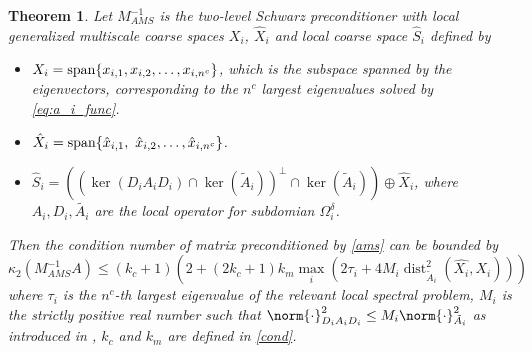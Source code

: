 \documentclass{article}
\DeclareMathOperator{\Dist}{dist}
\DeclareMathOperator{\Span}{span}
\DeclarePairedDelimiter{\CurlyBrackets}{\{}{\}}
\newtheorem{theorem}{Theorem}[section]
\theoremstyle{definition}
\theoremstyle{remark}
\begin{document}
\begin{theorem}
    Let $M_{AMS}^{-1}$ is the two-level Schwarz preconditioner with local generalized multiscale coarse spaces $X_i$, $\hat{X}_i$ and local coarse space $\hat{S}_i$ defined by
    \begin{itemize}
        \item $X_{i} = \Span \CurlyBrackets*{x_{i, 1}, x_{i, 2}, \dots, x_{i,n^c}}$, which is the subspace spanned by the eigenvectors, corresponding to the $n^c$ largest eigenvalues solved by \cref{eq:a_i_func}.
        \item $\hat{X}_{i} = \Span \CurlyBrackets*{\hat{x}_{i, 1},\ \hat{x}_{i, 2}, \dots, \hat{x}_{i,n^c}}$.
        \item $\hat{S}_{i} = ((\ker(D_i A_{i} D_i) \cap \ker(\tilde{A}_{i}))^{\perp} \cap \ker(\tilde{A}_{i}))\oplus \hat{X}_i$, where $A_i,D_i,\tilde{A_i}$ are the local operator for subdomian $\Omega_i^\delta$.
    \end{itemize}
    Then the condition number of matrix preconditioned by \cref{ams} can be bounded by
\begin{equation}\label{bound}
    \kappa_2(M_{AMS}^{-1} A) \leq (k_c + 1)\left(2 + (2k_c + 1) k_m \max_i (2\tau_i + 4 M_i\Dist^2_{\tilde{A}_i}(\hat{X_i}, X_i))\right)
\end{equation}
where $\tau_i$ is the $n^c$-th largest eigenvalue of the relevant local spectral problem, $M_i$ is the strictly positive real number such that $\norm{\cdot}^{2}_{D_iA_iD_i}\leq M_i\norm{\cdot}^{2}_{\tilde{A}_i}$ as introduced in \cite{ADDThm}, $k_c$ and $k_m$ are defined in \cref{cond}.
\end{theorem}
\end{document}
